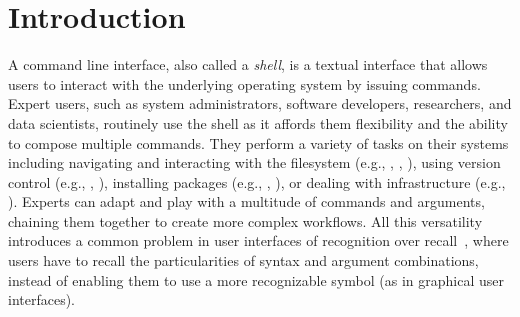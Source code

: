 \section{Introduction}

A command line interface, also called a \emph{shell}, is a textual interface that allows users to interact with the underlying operating system by issuing commands.
Expert users, such as system administrators, software developers, researchers, and data scientists, routinely use the shell as it affords them flexibility and the ability to compose multiple commands.
They perform a variety of tasks on their systems including navigating and interacting with the filesystem (e.g., , , ), using version control (e.g., , ), installing packages (e.g., , ), or dealing with infrastructure (e.g., ).
Experts can adapt and play with a multitude of commands and arguments, chaining them together to create more complex workflows.
All this versatility introduces a common problem in user interfaces of recognition over recall~\citep{nielsen:05}, where users have to recall the particularities of syntax and argument combinations, instead of enabling them to use a more recognizable symbol (as in graphical user interfaces).

